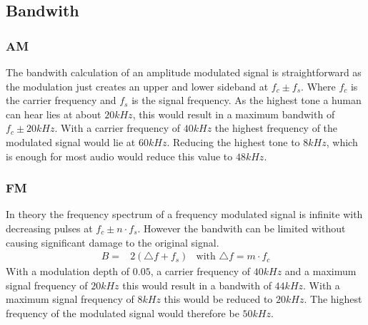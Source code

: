 \subsection{Bandwith}

\subsubsection*{AM}

The bandwith calculation of an amplitude modulated signal is straightforward as the modulation just creates an upper and lower sideband at $f_c \pm f_s$.\cite{netzberger_kommunikationstechnologie_2021-1} Where $f_c$ is the carrier frequency and $f_s$ is the signal frequency.\p
As the highest tone a human can hear lies at about $20kHz$, this would result in a maximum bandwith of $f_c \pm 20kHz$. With a carrier frequency of $40kHz$ the highest frequency of the modulated signal would lie at $60kHz$. Reducing the highest tone to $8kHz$, which is enough for most audio would reduce this value to $48kHz$.

\subsubsection*{FM}

In theory the frequency spectrum of a frequency modulated signal is infinite with decreasing pulses at $f_c \pm n \cdot f_s$. However the bandwith can be limited without causing significant damage to the original signal.\cite{netzberger_kommunikationstechnologie_2021-1}
%
\begin{align}
  B =& 2 (\triangle f + f_s) &\textrm{with~} \triangle f = m \cdot f_c
\end{align}
%
With a modulation depth of $0.05$, a carrier frequency of $40kHz$ and a maximum signal frequency of $20kHz$ this would result in a bandwith of $44kHz$. With a maximum signal frequency of $8kHz$ this would be reduced to $20kHz$. The highest frequency of the modulated signal would therefore be $50kHz$.